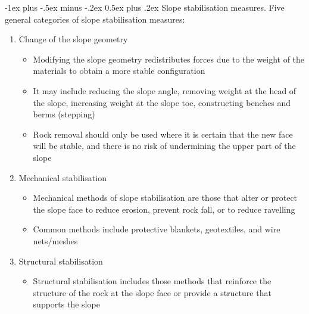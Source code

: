 \documentclass[10pt,landscape,a4paper]{article}
\makeatletter
\renewcommand{\section}{\@startsection{section}{1}{0mm}%
	{-1ex plus -.5ex minus -.2ex}%
	{0.5ex plus .2ex}%
	{\normalfont\large\bfseries}}
\makeatother
\begin{document}
\begin{multicols}{3}
	\section{Slope stabilisation measures.}
	Five general categories of slope stabilisation measures:
	\begin{enumerate}
		\item Change of the slope geometry
		      \begin{itemize}
			      \item Modifying the slope geometry redistributes forces due to the weight of the materials to obtain a more stable configuration
			      \item It may include reducing the slope angle, removing weight at the head of the slope, increasing weight at the slope toe, constructing benches and berms (stepping)
			      \item Rock removal should only be used where it is certain that the new face will be stable, and there is no risk of undermining the upper part of the slope
		      \end{itemize}
		\item Mechanical stabilisation
		      \begin{itemize}
			      \item Mechanical methods of slope stabilisation are those that alter or protect the slope face to reduce erosion, prevent rock fall, or to reduce ravelling
			      \item Common methods include protective blankets, geotextiles, and wire nets/meshes
		      \end{itemize}
		\item Structural stabilisation
		      \begin{itemize}
			      \item Structural stabilisation includes those methods that reinforce the structure of the rock at the slope face or provide a structure that supports the slope

\end{itemize}
\end{enumerate}
\end{multicols}
\end{document}
